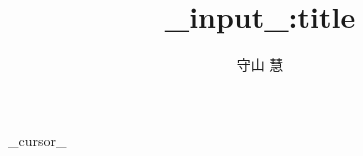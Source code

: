 \documentclass[a4j,11pt]{jarticle}
\title{{{_input_:title}}}
\author{守山 慧}
\begin{document}
{{_cursor_}}
\end{document}

